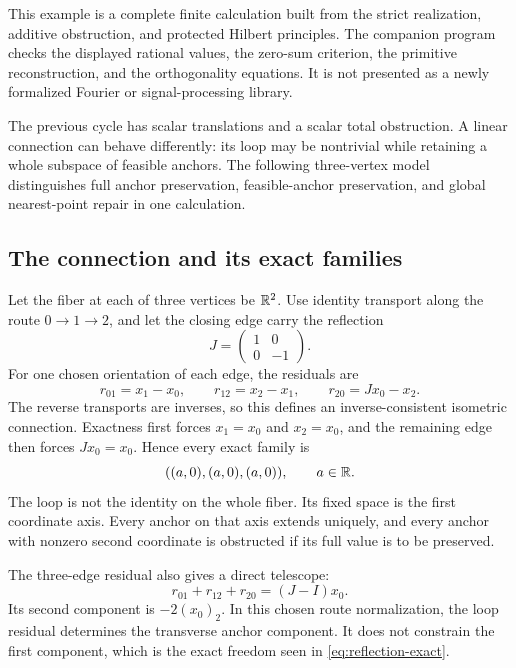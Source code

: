 This example is a complete finite calculation built from the strict realization, additive obstruction, and protected Hilbert principles. The companion program checks the displayed rational values, the zero-sum criterion, the primitive reconstruction, and the orthogonality equations. It is not presented as a newly formalized Fourier or signal-processing library.

\label{sec:twisted-loop}
The previous cycle has scalar translations and a scalar total obstruction. A linear connection can behave differently: its loop may be nontrivial while retaining a whole subspace of feasible anchors. The following three-vertex model distinguishes full anchor preservation, feasible-anchor preservation, and global nearest-point repair in one calculation.

\subsection{The connection and its exact families}
Let the fiber at each of three vertices be \(\mathbb R^2\). Use identity transport along the route \(0\to1\to2\), and let the closing edge carry the reflection
\[
 J=\begin{pmatrix}1&0\\0&-1\end{pmatrix}.
\]
For one chosen orientation of each edge, the residuals are
\[
 r_{01}=x_1-x_0,\qquad r_{12}=x_2-x_1,\qquad
 r_{20}=Jx_0-x_2.
\]
The reverse transports are inverses, so this defines an inverse-consistent isometric connection. Exactness first forces \(x_1=x_0\) and \(x_2=x_0\), and the remaining edge then forces \(Jx_0=x_0\). Hence every exact family is
\begin{equation}\label{eq:reflection-exact}
 ((a,0),(a,0),(a,0)),\qquad a\in\mathbb R.
\end{equation}
The loop is not the identity on the whole fiber. Its fixed space is the first coordinate axis. Every anchor on that axis extends uniquely, and every anchor with nonzero second coordinate is obstructed if its full value is to be preserved.

The three-edge residual also gives a direct telescope:
\[
 r_{01}+r_{12}+r_{20}=(J-I)x_0.
\]
Its second component is \(-2(x_0)_2\). In this chosen route normalization, the loop residual determines the transverse anchor component. It does not constrain the first component, which is the exact freedom seen in \eqref{eq:reflection-exact}.


